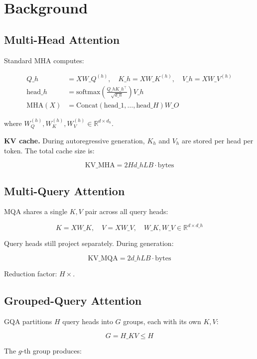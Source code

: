 
\section{Background}

\subsection{Multi-Head Attention}

Standard MHA computes:

\[
\begin{aligned}
Q\_h &= X W\_Q^{(h)}, \quad K\_h = X W\_K^{(h)}, \quad V\_h = X W\_V^{(h)} \\
\text{head}\_h &= \text{softmax}\!\left(\frac{Q\_h K\_h^\top}{\sqrt{d\_h}}\right) V\_h \\
\text{MHA}(X) &= \text{Concat}(\text{head}\_1, \dots, \text{head}\_H) W\_O
\end{aligned}
\tag{3.1}
\]

where $W_Q^{(h)}, W_K^{(h)}, W_V^{(h)} \in \mathbb{R}^{d \times d_h}$.

\textbf{KV cache.} During autoregressive generation, $K_h$ and $V_h$ are stored 
per head per token. The total cache size is:

\[
\text{KV}\_\text{MHA} = 2 H d\_h L B \cdot \text{bytes}
\tag{3.2}
\]

\subsection{Multi-Query Attention}

MQA shares a single $K, V$ pair across all query heads:

\[
K = X W\_K, \quad V = X W\_V, \quad W\_K, W\_V \in \mathbb{R}^{d \times d\_h}
\tag{3.3}
\]

Query heads still project separately. During generation:

\[
\text{KV}\_\text{MQA} = 2 d\_h L B \cdot \text{bytes}
\tag{3.4}
\]

Reduction factor: $H\times$.

\subsection{Grouped-Query Attention}

GQA partitions $H$ query heads into $G$ groups, each with its own $K, V$:

\[
G = H\_{KV} \le H
\tag{3.5}
\]

The $g$-th group produces:

